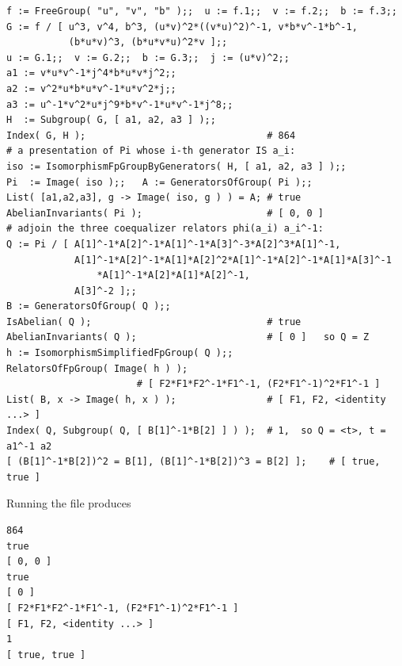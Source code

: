 \documentclass[11pt]{amsart}
\theoremstyle{definition}
\theoremstyle{remark}
\begin{document}
\begin{lstlisting}
f := FreeGroup( "u", "v", "b" );;  u := f.1;;  v := f.2;;  b := f.3;;
G := f / [ u^3, v^4, b^3, (u*v)^2*((v*u)^2)^-1, v*b*v^-1*b^-1,
           (b*u*v)^3, (b*u*v*u)^2*v ];;
u := G.1;;  v := G.2;;  b := G.3;;  j := (u*v)^2;;
a1 := v*u*v^-1*j^4*b*u*v*j^2;;
a2 := v^2*u*b*u*v^-1*u*v^2*j;;
a3 := u^-1*v^2*u*j^9*b*v^-1*u*v^-1*j^8;;
H  := Subgroup( G, [ a1, a2, a3 ] );;
Index( G, H );                                # 864
# a presentation of Pi whose i-th generator IS a_i:
iso := IsomorphismFpGroupByGenerators( H, [ a1, a2, a3 ] );;
Pi  := Image( iso );;   A := GeneratorsOfGroup( Pi );;
List( [a1,a2,a3], g -> Image( iso, g ) ) = A; # true
AbelianInvariants( Pi );                      # [ 0, 0 ]
# adjoin the three coequalizer relators phi(a_i) a_i^-1:
Q := Pi / [ A[1]^-1*A[2]^-1*A[1]^-1*A[3]^-3*A[2]^3*A[1]^-1,
            A[1]^-1*A[2]^-1*A[1]*A[2]^2*A[1]^-1*A[2]^-1*A[1]*A[3]^-1
                *A[1]^-1*A[2]*A[1]*A[2]^-1,
            A[3]^-2 ];;
B := GeneratorsOfGroup( Q );;
IsAbelian( Q );                               # true
AbelianInvariants( Q );                       # [ 0 ]   so Q = Z
h := IsomorphismSimplifiedFpGroup( Q );;
RelatorsOfFpGroup( Image( h ) );
                       # [ F2*F1*F2^-1*F1^-1, (F2*F1^-1)^2*F1^-1 ]
List( B, x -> Image( h, x ) );                # [ F1, F2, <identity ...> ]
Index( Q, Subgroup( Q, [ B[1]^-1*B[2] ] ) );  # 1,  so Q = <t>, t = a1^-1 a2
[ (B[1]^-1*B[2])^2 = B[1], (B[1]^-1*B[2])^3 = B[2] ];    # [ true, true ]
\end{lstlisting}

Running the file produces 
\begin{lstlisting}
864
true
[ 0, 0 ]
true
[ 0 ]
[ F2*F1*F2^-1*F1^-1, (F2*F1^-1)^2*F1^-1 ]
[ F1, F2, <identity ...> ]
1
[ true, true ]
\end{lstlisting}
\end{document}
